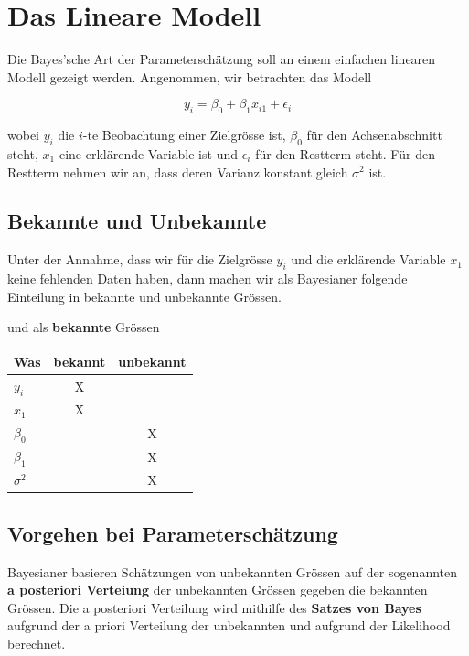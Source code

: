 \documentclass[]{book}
\begin{document}
\section{Das Lineare Modell}\label{das-lineare-modell}

Die Bayes'sche Art der Parameterschätzung soll an einem einfachen
linearen Modell gezeigt werden. Angenommen, wir betrachten das Modell

\begin{equation}
y_i = \beta_0 + \beta_1 x_{i1} + \epsilon_i
\label{eq:BayLinMod}
\end{equation}

wobei \(y_i\) die \(i\)-te Beobachtung einer Zielgrösse ist, \(\beta_0\)
für den Achsenabschnitt steht, \(x_1\) eine erklärende Variable ist und
\(\epsilon_i\) für den Restterm steht. Für den Restterm nehmen wir an,
dass deren Varianz konstant gleich \(\sigma^2\) ist.

\subsection{Bekannte und Unbekannte}\label{bekannte-und-unbekannte}

Unter der Annahme, dass wir für die Zielgrösse \(y_i\) und die
erklärende Variable \(x_1\) keine fehlenden Daten haben, dann machen wir
als Bayesianer folgende Einteilung in bekannte und unbekannte Grössen.

und als \textbf{bekannte} Grössen

\begin{center}
\begin{tabular}{p{3cm}cc}
\hline
Was         &  bekannt  &  unbekannt \\
\hline
$y_i$       &    X      & \\
$x_1$       &    X      & \\
$\beta_0$   &           &      X \\
$\beta_1$   &           &      X \\
$\sigma^2$  &           &      X \\
\hline
\end{tabular}
\end{center}

\subsection{Vorgehen bei
Parameterschätzung}\label{vorgehen-bei-parameterschatzung}

Bayesianer basieren Schätzungen von unbekannten Grössen auf der
sogenannten \textbf{a posteriori Verteiung} der unbekannten Grössen
gegeben die bekannten Grössen. Die a posteriori Verteilung wird mithilfe
des \textbf{Satzes von Bayes} aufgrund der a priori Verteilung der
unbekannten und aufgrund der Likelihood berechnet.
\end{document}
